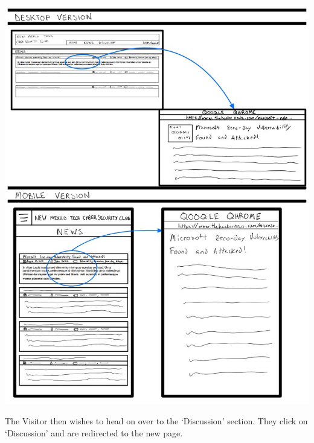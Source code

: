 \documentclass{article}
\begin{document}
\includegraphics[scale=0.60]{visitor_3.jpg}
\par The Visitor then wishes to head on over to the ‘Discussion’ section.  They click on ‘Discussion’ and are redirected to the new page.  
\par
\end{document}
